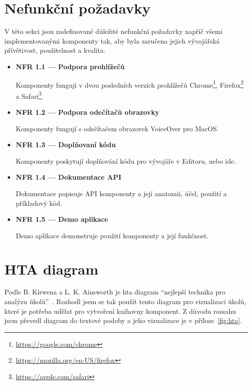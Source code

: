 \section{Nefunkční požadavky}

V této sekci jsou zadefinované důležité nefunkční požadavky napříč všemi implementovanými komponenty tak, aby byla zaručena jejich vývojářská přívětivost, použitelnost a kvalita.

\begin{itemize}
      \item \textbf{NFR 1.1 --- Podpora prohlížečů}\label{nfr11}

            Komponenty fungují v dvou posledních verzích prohlížečů Chrome\footnote{\url{https://google.com/chrome}}, Firefox\footnote{\url{https://mozilla.org/en-US/firefox}} a Safari\footnote{\url{https://apple.com/safari}}.

      \item \textbf{NFR 1.2 --- Podpora odečítačů obrazovky}\label{nfr12}

            Komponenty fungují s odečítačem obrazovek VoiceOver pro MacOS.

      \item \textbf{NFR 1.3 --- Doplňovaní kódu}

            Komponenty poskytují doplňování kódu pro vývojáře v Editoru, nebo \gls{ide}.

      \item \textbf{NFR 1.4 --- Dokumentace API}\label{nfr14}

            Dokumentace popisuje API komponenty a její anatomii, účel, použití a příkladový kód.

      \item \textbf{NFR 1.5 --- Demo aplikace}\label{nfr15}

            Demo aplikace demonstruje použití komponenty a její funkčnost.
\end{itemize}

\section{HTA diagram}

Podle B. Kirwena a L. K. Ainsworth je \gls{hta} diagram ``nejlepší technika pro analýzu úkolů''~\cite{kirwan1992}.
Rozhodl jsem se tak použít tento diagram pro vizualizaci úkolů, které je potřeba udělat pro vytvoření knihovny komponent.
Z důvodu rozsahu jsem převedl diagram do textové podoby a jeho vizualizace je v příloze~\ref{fig:hta}.

